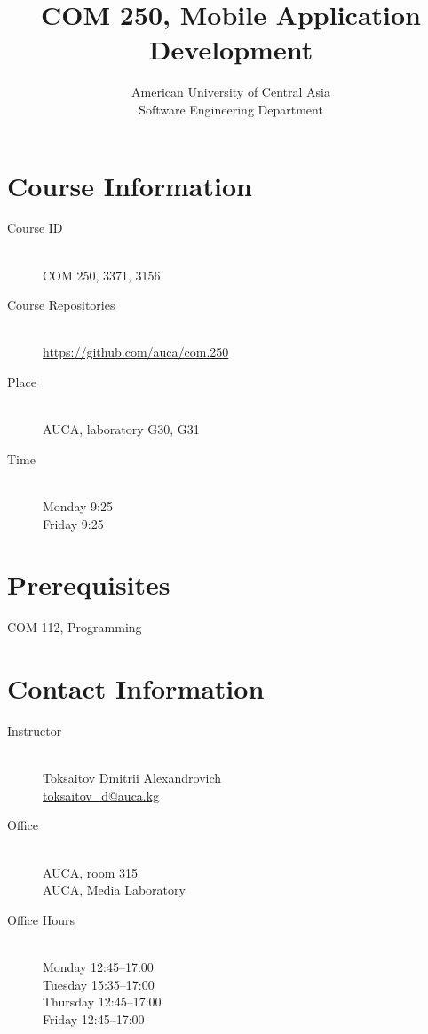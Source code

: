 \documentclass[12pt,a4paper,oneside]{article}
\newcommand{\R}[1]{\uppercase\expandafter{\romannumeral #1\relax}}
\begin{document}
    \title{COM 250, Mobile Application Development}
    \author{
        American University of Central Asia\\
        Software Engineering Department
    }
    \date{}
    \maketitle

    \section{Course Information}

        \begin{description}
            \item[Course ID]\hfill\\
                COM 250, 3371, 3156
            \item[Course Repositories]\hfill\\
                \url{https://github.com/auca/com.250}
            \item[Place]\hfill\\
                AUCA, laboratory G30, G31
            \item[Time]\hfill\\
                Monday 9:25\\
                Friday 9:25
        \end{description}

    \section{Prerequisites}

        COM 112, Programming \R{2}

    \section{Contact Information}

        \begin{description}
            \item[Instructor]\hfill\\
                Toksaitov Dmitrii Alexandrovich\\
                \href{mailto:toksaitov_d@auca.kg}{toksaitov\_d@auca.kg}
            \item[Office]\hfill\\
                AUCA, room 315\\
                AUCA, Media Laboratory
            \item[Office Hours]\hfill\\
                Monday 12:45--17:00\\
                Tuesday 15:35--17:00\\
                Thursday 12:45--17:00\\
                Friday 12:45--17:00
        \end{description}
\end{document}
